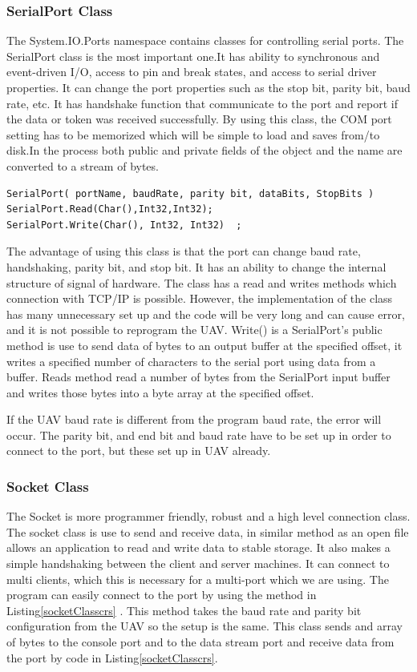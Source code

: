 \documentclass[oneside]{ecsgdp}         %
\begin{document}
\subsubsection{SerialPort Class}
The System.IO.Ports namespace contains classes for controlling serial ports. The SerialPort class is the most important one.It has ability to synchronous and event-driven I/O, access to pin and break states, and access to serial driver properties\cite{peak_netFrame}. It can change the port properties such as the stop bit, parity bit, baud rate, etc. It has handshake function that communicate to the port and report if the data or token was received successfully.
By using this class, the COM port setting has to be memorized which will be simple to load and saves from/to disk.In the process both public and private fields of the object and the name are converted to a stream of bytes.

\begin{lstlisting}[caption=Serial Port class connection\, read and write method, label=serialPortconn]
SerialPort( portName, baudRate, parity bit, dataBits, StopBits ) 
SerialPort.Read(Char(),Int32,Int32);
SerialPort.Write(Char(), Int32, Int32)	;
\end{lstlisting}

The advantage of using this class is that the port can change baud rate, handshaking, parity bit, and stop bit. It has an ability to change the internal structure of signal of hardware. The class has a read and writes methods which connection with TCP/IP is possible.
However, the implementation of the class has many unnecessary set up and the code will be very long and can cause error, and it is not possible to reprogram the UAV.
Write() is a SerialPort's public method is use to send data of bytes to an output buffer at the specified offset, it writes a specified number of characters to the serial port using data from a buffer.
Reads method read a number of bytes from the SerialPort input buffer and writes those bytes into a byte array at the specified offset.

If the UAV baud rate is different from the program baud rate, the error will occur.
The parity bit, and end bit and baud rate have to be set up in order to connect to the port, but these set up in UAV already.
\subsubsection{Socket Class}
The Socket is more programmer friendly, robust and a high level connection class. The socket class is use to send and receive data, in similar method as an open file allows an application to read and write data to stable storage.  It also makes a simple handshaking between the client and server machines. It can connect to multi clients, which this is necessary for a multi-port which we are using. The program can easily connect to the port by using the method in Listing\ref{socketClasscrs} .
This method takes the baud rate and parity bit configuration from the UAV so the setup is the same. This class sends and array of bytes to the console port and to the data stream port and receive data from the port by code in Listing\ref{socketClasscrs}.
\end{document}
